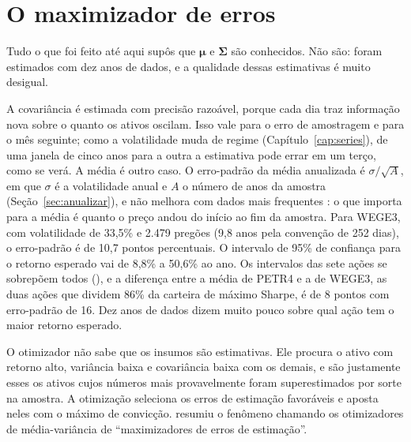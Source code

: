 \section{O maximizador de erros}
\label{sec:c08-erro}

Tudo o que foi feito até aqui supôs que $\symbf{\mu}$ e $\symbf{\Sigma}$ são conhecidos. Não são: foram estimados com dez anos de dados, e a qualidade dessas estimativas é muito desigual.

A covariância é estimada com precisão razoável, porque cada dia traz informação nova sobre o quanto os ativos oscilam. Isso vale para o erro de amostragem e para o mês seguinte; como a volatilidade muda de regime (Capítulo~\ref{cap:series}), de uma janela de cinco anos para a outra a estimativa pode errar em um terço, como se verá. A média é outro caso. O erro-padrão da média anualizada é $\sigma/\sqrt{A}$, em que $\sigma$ é a volatilidade anual e $A$ o número de anos da amostra (Seção~\ref{sec:anualizar}), e não melhora com dados mais frequentes \citep{merton1980}: o que importa para a média é quanto o preço andou do início ao fim da amostra. Para WEGE3, com volatilidade de 33,5\% e 2.479 pregões (9,8 anos pela convenção de 252 dias), o erro-padrão é de 10,7 pontos percentuais. O intervalo de 95\% de confiança para o retorno esperado vai de 8,8\% a 50,6\% ao ano. Os intervalos das sete ações se sobrepõem todos (), e a diferença entre a média de PETR4 e a de WEGE3, as duas ações que dividem 86\% da carteira de máximo Sharpe, é de 8 pontos com erro-padrão de 16. Dez anos de dados dizem muito pouco sobre qual ação tem o maior retorno esperado.

\begin{intuicao}
O otimizador não sabe que os insumos são estimativas. Ele procura o ativo com retorno alto, variância baixa e covariância baixa com os demais, e são justamente esses os ativos cujos números mais provavelmente foram superestimados por sorte na amostra. A otimização seleciona os erros de estimação favoráveis e aposta neles com o máximo de convicção. \citet{michaud1989} resumiu o fenômeno chamando os otimizadores de média-variância de ``maximizadores de erros de estimação''.
\end{intuicao}

